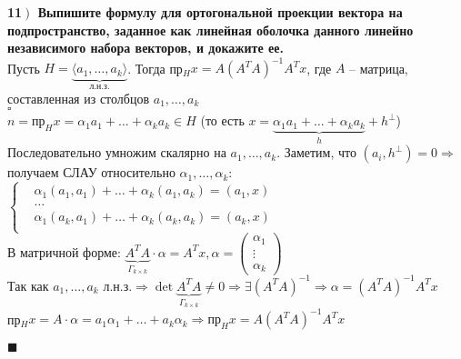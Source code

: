 \documentclass[a4paper,12pt]{article}
\begin{document}
    \textbf{11$\left.\right)$ Выпишите формулу для ортогональной проекции вектора на подпространство, заданное как линейная оболочка данного линейно независимого набора векторов, и докажите ее.}\\
    Пусть $H=\underbrace{\langle a_1, \ldots, a_k \rangle}_{\text{л.н.з.}}$. Тогда пр$_Hx=A(A^TA)^{-1}A^Tx$, где $A$ -- матрица, составленная из столбцов $a_1, \ldots, a_k$\\
    $\square$\\
    $n=\text{пр}_Hx=\alpha_1a_1+\ldots+\alpha_ka_k\in H$ (то есть $x=\underbrace{\alpha_1a_1+\ldots+\alpha_ka_k}_h+h^\perp$)\\
    Последовательно умножим скалярно на $a_1, \ldots, a_k$. Заметим, что $(a_i, h^\perp)=0\Rightarrow$получаем СЛАУ относительно $\alpha_1, \ldots, \alpha_k:$\\
    $\left\lbrace \begin{aligned}
                      &\alpha_1(a_1, a_1)+\ldots+\alpha_k(a_1, a_k)=(a_1, x)\\
                      &\ldots\\
                      &\alpha_1(a_k, a_1)+\ldots+\alpha_k(a_k, a_k)=(a_k, x)\\
    \end{aligned}\right.$\\
    В матричной форме: $\underbrace{A^TA}_{\Gamma_{k\times k}}\cdot\alpha=A^Tx, \alpha=\begin{pmatrix}
                                                                                           \alpha_1 \\
                                                                                           \vdots   \\
                                                                                           \alpha_k
    \end{pmatrix}$\\
    Так как $a_1, \ldots, a_k$ л.н.з.$\Rightarrow\det\underbrace{A^TA}_{\Gamma_{k\times k}}\ne0\Rightarrow\exists(A^TA)^{-1}\Rightarrow\alpha=(A^TA)^{-1}A^Tx$\\
    пр$_Hx=A\cdot\alpha=a_1\alpha_1+\ldots+a_k\alpha_k\Rightarrow\text{пр}_Hx=A(A^TA)^{-1}A^Tx$
    \begin{flushright}
        $\blacksquare$
    \end{flushright}
\end{document}
